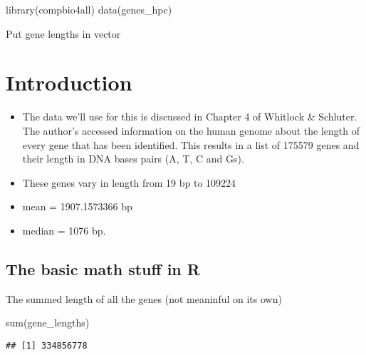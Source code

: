 \documentclass[
]{book}
\newenvironment{Shaded}{\begin{snugshade}}{\end{snugshade}}
\newcommand{\FunctionTok}[1]{\textcolor[rgb]{0.00,0.00,0.00}{#1}}
\newcommand{\NormalTok}[1]{#1}
\newcommand{\OtherTok}[1]{\textcolor[rgb]{0.56,0.35,0.01}{#1}}
\newcommand{\SpecialCharTok}[1]{\textcolor[rgb]{0.00,0.00,0.00}{#1}}
\begin{document}
\begin{Shaded}
\begin{Highlighting}[]
\FunctionTok{library}\NormalTok{(compbio4all)}
\FunctionTok{data}\NormalTok{(genes\_hpc)}
\end{Highlighting}
\end{Shaded}

Put gene lengths in vector

\begin{Shaded}
\end{Shaded}

\hypertarget{introduction-6}{%
\chapter{Introduction}\label{introduction-6}}

\begin{itemize}
\item
  The data we'll use for this is discussed in Chapter 4 of Whitlock \& Schluter. The author's accessed information on the human genome about the length of every gene that has been identified. This results in a list of
  175579 genes and their length in DNA bases pairs (A, T, C and Gs).
\item
  These genes vary in length from 19 bp to 109224
\item
  mean = 1907.1573366 bp
\item
  median = 1076 bp.
\end{itemize}

\hypertarget{the-basic-math-stuff-in-r}{%
\section{The basic math stuff in R}\label{the-basic-math-stuff-in-r}}

The summed length of all the genes (not meaninful on its own)

\begin{Shaded}
\begin{Highlighting}[]
\FunctionTok{sum}\NormalTok{(gene\_lengths)}
\end{Highlighting}
\end{Shaded}

\begin{verbatim}
## [1] 334856778
\end{verbatim}
\end{document}
